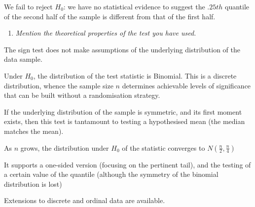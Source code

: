 \documentclass[
]{article}
\providecommand{\tightlist}{%
  \setlength{\itemsep}{0pt}\setlength{\parskip}{0pt}}
\begin{document}
We fail to reject \(H_0\): we have no statistical evidence to suggest
the \(.25th\) quantile of the second half of the sample is different
from that of the first half.

\begin{enumerate}
\def\labelenumi{\arabic{enumi}.}
\setcounter{enumi}{3}
\tightlist
\item
  \emph{Mention the theoretical properties of the test you have used.}
\end{enumerate}

The sign test does not make assumptions of the underlying distribution
of the data sample.

Under \(H_0\), the distribution of the test statistic is Binomial. This
is a discrete distribution, whence the sample size \(n\) determines
achievable levels of significance that can be built without a
randomisation strategy.

If the underlying distribution of the sample is symmetric, and its first
moment exists, then this test is tantamount to testing a hypothesised
mean (the median matches the mean).

As \(n\) grows, the distribution under \(H_0\) of the statistic
converges to \(N(\frac{n}{2}, \frac{n}{4})\)

It supports a one-sided version (focusing on the pertinent tail), and
the testing of a certain value of the quantile (although the symmetry of
the binomial distribution is lost)

Extensions to discrete and ordinal data are available.
\end{document}
